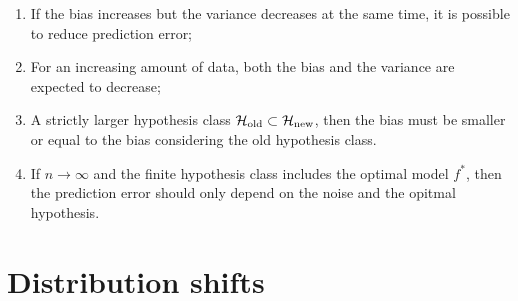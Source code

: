 \documentclass[a4paper, 10pt]{article}
\begin{document}
\begin{enumerate}[label=(\alph*)]
    \item If the bias increases but the variance decreases at the same time, it is possible to reduce prediction error;
    \item For an increasing amount of data, both the bias and the variance are expected to decrease;
    \item A strictly larger hypothesis class $\mathcal{H}_{\rm old} \subset \mathcal{H}_{\rm new}$, then the bias must be smaller or equal to the bias considering the old hypothesis class.
    \item If $n\rightarrow \infty$ and the finite hypothesis class includes the optimal model $f^*$, then the prediction error should only depend on the noise and the opitmal hypothesis.
\end{enumerate}

\section{Distribution shifts}
\end{document}
